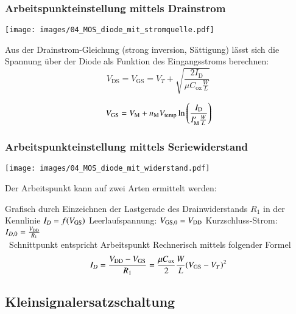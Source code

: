 \subsubsection{Arbeitspunkteinstellung mittels Drainstrom}

\begin{minipage}[t]{0.3\columnwidth}
    \texttt{[image: images/04\_MOS\_diode\_mit\_stromquelle.pdf]}
\end{minipage}
\hfill
\begin{minipage}[t]{0.66\columnwidth}
    Aus der Drainstrom-Gleichung (strong inversion, Sättigung) lässt sich die Spannung über der Diode als Funktion des Eingangsstroms berechnen:
    \[
        V_\text{DS} = V_\text{GS} = V_T + \sqrt{\frac{2 I_\text{D}}{\mu C_\text{ox} \frac{W}{L}}}
    \]

    \[
        V_{\rm GS} = V_\text{M} + n_{\rm M} V_\text{temp} \ln\left(\frac{I_\text{D}}{I_{\rm M}' \frac{W}{L}}\right)
    \]
\end{minipage}


\subsubsection{Arbeitspunkteinstellung mittels Seriewiderstand}

\begin{minipage}[t]{0.3\columnwidth}
    \texttt{[image: images/04\_MOS\_diode\_mit\_widerstand.pdf]}
\end{minipage}
\hfill
\begin{minipage}[t]{0.66\columnwidth}
    Der Arbeitspunkt kann auf zwei Arten ermittelt werden:

    \smallskip
    
    \begin{outline}
        \1 Grafisch durch Einzeichnen der Lastgerade des Drainwiderstands $R_1$ in der Kennlinie $I_D = f(V_{\rm GS})$
            \2 Leerlaufspannung: $V_{\rm GS,0} = V_{\rm DD}$
            \2 Kurzschluss-Strom: $I_{D, 0} = \frac{V_{\rm DD}}{R_1}$ \\
            \textrightarrow\ Schnittpunkt entspricht Arbeitspunkt
            \smallskip
        \1 Rechnerisch mittels folgender Formel
        $$ I_D = \frac{V_{\rm DD} - V_{\rm GS}}{R_1} = \frac{\mu C_{\rm ox}}{2} \frac{W}{L} (V_{\rm GS} - V_T)^2 $$
    \end{outline}
\end{minipage}


\subsection{Kleinsignalersatzschaltung}


